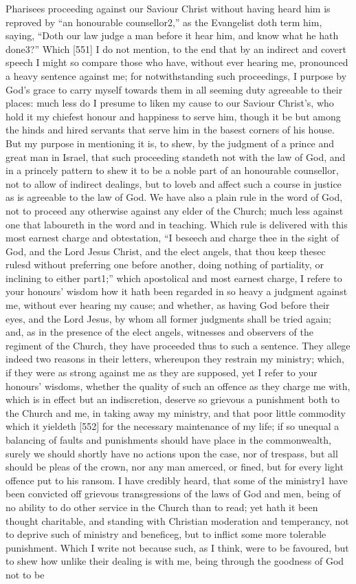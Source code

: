 Pharisees proceeding against our Saviour Christ without having heard him is reproved by “an honourable counsellor2,” as the Evangelist doth term him, saying, “Doth our law judge a man before it hear him, and know what he hath done3?” Which [551] I do not mention, to the end that by an indirect and covert speech I might so compare those who have, without ever hearing me, pronounced a heavy sentence against me; for notwithstanding such proceedings, I purpose by God’s grace to carry myself towards them in all seeming duty agreeable to their places: much less do I presume to liken my cause to our Saviour Christ’s, who hold it my chiefest honour and happiness to serve him, though it be but among the hinds and hired servants that serve him in the basest corners of his house. But my purpose in mentioning it is, to shew, by the judgment of a prince and great man in Israel, that such proceeding standeth not with the law of God, and in a princely pattern to shew it to be a noble part of an honourable counsellor, not to allow of indirect dealings, but to loveb and affect such a course in justice as is agreeable to the law of God. We have also a plain rule in the word of God, not to proceed any otherwise against any elder of the Church; much less against one that laboureth in the word and in teaching. Which rule is delivered with this most earnest charge and obtestation, “I beseech and charge thee in the sight of God, and the Lord Jesus Christ, and the elect angels, that thou keep thesec rulesd without preferring one before another, doing nothing of partiality, or inclining to either part1;” which apostolical and most earnest charge, I refere to your honours’ wisdom how it hath been regarded in so heavy a judgment against me, without ever hearing my cause; and whether, as having God before their eyes, and the Lord Jesus, by whom all former judgments shall be tried again; and, as in the presence of the elect angels, witnesses and observers of the regiment of the Church, they have proceeded thus to such a sentence. They allege indeed two reasons in their letters, whereupon they restrain my ministry; which, if they were as strong against me as they are supposed, yet I refer to your honours’ wisdoms, whether the quality of such an offence as they charge me with, which is in effect but an indiscretion, deserve so grievous a punishment both to the Church and me, in taking away my ministry, and that poor little commodity which it yieldeth [552] for the necessary maintenance of my life; if so unequal a balancing of faults and punishments should have place in the commonwealth, surely we should shortly have no actions upon the case, nor of trespass, but all should be pleas of the crown, nor any man amerced, or fined, but for every light offence put to his ransom. I have credibly heard, that some of the ministry1 have been convicted off grievous transgressions of the laws of God and men, being of no ability to do other service in the Church than to read; yet hath it been thought charitable, and standing with Christian moderation and temperancy, not to deprive such of ministry and beneficeg, but to inflict some more tolerable punishment. Which I write not because such, as I think, were to be favoured, but to shew how unlike their dealing is with me, being through the goodness of God not to be 